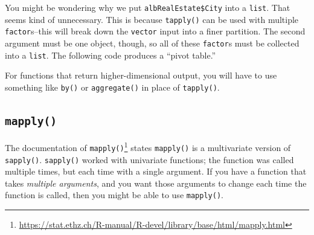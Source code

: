 \documentclass[
  12pt,
  krantz2]{krantz}
\makeatletter
\newenvironment{Shaded}{\begin{snugshade}}{\end{snugshade}}
\newcommand{\DecValTok}[1]{\textcolor[rgb]{0.06,0.06,0.06}{#1}}
\newcommand{\DocumentationTok}[1]{\textcolor[rgb]{0.37,0.37,0.37}{\textbf{\textit{#1}}}}
\newcommand{\FunctionTok}[1]{\textcolor[rgb]{0,0,0}{#1}}
\newcommand{\NormalTok}[1]{#1}
\newcommand{\OtherTok}[1]{\textcolor[rgb]{0.37,0.37,0.37}{#1}}
\newcommand{\SpecialCharTok}[1]{\textcolor[rgb]{0,0,0}{#1}}
\renewcommand{\href}[2]{#2\footnote{\url{#1}}}
\newenvironment{kframe}{%
\medskip{}
\setlength{\fboxsep}{.8em}
 \def\at@end@of@kframe{}%
 \ifinner\ifhmode%
  \def\at@end@of@kframe{\end{minipage}}%
  \begin{minipage}{\columnwidth}%
 \fi\fi%
 \def\FrameCommand##1{\hskip\@totalleftmargin \hskip-\fboxsep
 \colorbox{shadecolor}{##1}\hskip-\fboxsep
     \hskip-\linewidth \hskip-\@totalleftmargin \hskip\columnwidth}%
 \MakeFramed {\advance\hsize-\width
   \@totalleftmargin\z@ \linewidth\hsize
   \@setminipage}}%
 {\par\unskip\endMakeFramed%
 \at@end@of@kframe}
\renewenvironment{Shaded}{\begin{kframe}}{\end{kframe}}
\makeatother
\begin{document}
You might be wondering why we put \texttt{albRealEstate\$City} into a \texttt{list}. That seems kind of unnecessary. This is because \texttt{tapply()} can be used with multiple \texttt{factor}s--this will break down the \texttt{vector} input into a finer partition. The second argument must be one object, though, so all of these \texttt{factor}s must be collected into a \texttt{list}. The following code produces a ``pivot table.''

\begin{Shaded}
\end{Shaded}

\begin{rmd-details}
For functions that return higher-dimensional output, you will have to use something like \texttt{by()} or \texttt{aggregate()} in place of \texttt{tapply()}.

\end{rmd-details}

\hypertarget{mapply}{%
\subsection{\texorpdfstring{\texttt{mapply()}}{mapply()}}\label{mapply}}

The \href{https://stat.ethz.ch/R-manual/R-devel/library/base/html/mapply.html}{documentation of \texttt{mapply()}} states \texttt{mapply()} is a multivariate version of \texttt{sapply()}. \texttt{sapply()} worked with univariate functions; the function was called multiple times, but each time with a single argument. If you have a function that takes \emph{multiple arguments}, and you want those arguments to change each time the function is called, then you might be able to use \texttt{mapply()}.
\end{document}
